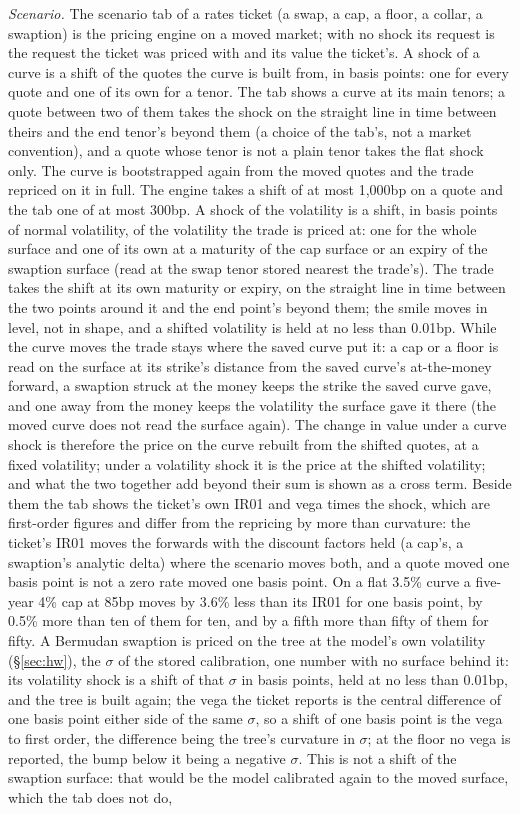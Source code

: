 \documentclass[11pt,a4paper]{article}
\begin{document}
\emph{Scenario.}\label{sec:scenario} The scenario tab of a rates ticket (a swap, a cap, a floor, a collar, a swaption) is the pricing engine on a moved market; with no shock its request is the request the ticket was priced with and its value the ticket's. A shock of a curve is a shift of the quotes the curve is built from, in basis points: one for every quote and one of its own for a tenor. The tab shows a curve at its main tenors; a quote between two of them takes the shock on the straight line in time between theirs and the end tenor's beyond them (a choice of the tab's, not a market convention), and a quote whose tenor is not a plain tenor takes the flat shock only. The curve is bootstrapped again from the moved quotes and the trade repriced on it in full. The engine takes a shift of at most 1{,}000bp on a quote and the tab one of at most 300bp. A shock of the volatility is a shift, in basis points of normal volatility, of the volatility the trade is priced at: one for the whole surface and one of its own at a maturity of the cap surface or an expiry of the swaption surface (read at the swap tenor stored nearest the trade's). The trade takes the shift at its own maturity or expiry, on the straight line in time between the two points around it and the end point's beyond them; the smile moves in level, not in shape, and a shifted volatility is held at no less than 0.01bp. While the curve moves the trade stays where the saved curve put it: a cap or a floor is read on the surface at its strike's distance from the saved curve's at-the-money forward, a swaption struck at the money keeps the strike the saved curve gave, and one away from the money keeps the volatility the surface gave it there (the moved curve does not read the surface again). The change in value under a curve shock is therefore the price on the curve rebuilt from the shifted quotes, at a fixed volatility; under a volatility shock it is the price at the shifted volatility; and what the two together add beyond their sum is shown as a cross term. Beside them the tab shows the ticket's own IR01 and vega times the shock, which are first-order figures and differ from the repricing by more than curvature: the ticket's IR01 moves the forwards with the discount factors held (a cap's, a swaption's analytic delta) where the scenario moves both, and a quote moved one basis point is not a zero rate moved one basis point. On a flat 3.5\% curve a five-year 4\% cap at 85bp moves by 3.6\% less than its IR01 for one basis point, by 0.5\% more than ten of them for ten, and by a fifth more than fifty of them for fifty. A Bermudan swaption is priced on the tree at the model's own volatility (\S\ref{sec:hw}), the $\sigma$ of the stored calibration, one number with no surface behind it: its volatility shock is a shift of that $\sigma$ in basis points, held at no less than 0.01bp, and the tree is built again; the vega the ticket reports is the central difference of one basis point either side of the same $\sigma$, so a shift of one basis point is the vega to first order, the difference being the tree's curvature in $\sigma$; at the floor no vega is reported, the bump below it being a negative $\sigma$. This is not a shift of the swaption surface: that would be the model calibrated again to the moved surface, which the tab does not do, 
\end{document}
